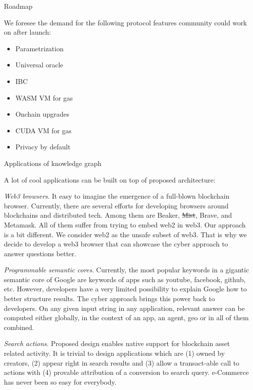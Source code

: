 \documentclass[10pt,oneside]{amsart}
\makeatletter
\def\section{\@startsection{section}{1}%
  \z@{.7\linespacing\@plus\linespacing}{.5\linespacing}%
  {\normalfont\scshape}}%
\makeatother
\begin{document}
\section{Roadmap}\label{Roadmap}

We foresee the demand for the following protocol features community could work on after launch:

\begin{itemize}
\item Parametrization
\item Universal oracle
\item IBC
\item WASM VM for gas
\item Onchain upgrades
\item CUDA VM for gas
\item Privacy by default
\end{itemize}

\section{Applications of knowledge graph}\label{Applications of knowledge graph}

A lot of cool applications can be built on top of proposed architecture:

\textit{Web3 browsers}. It easy to imagine the emergence of a full-blown blockchain browser. Currently, there are several efforts for developing browsers around blockchains and distributed tech. Among them are Beaker, \sout{Mist}, Brave, and Metamask. All of them suffer from trying to embed web2 in web3. Our approach is a bit different. We consider web2 as the unsafe subset of web3. That is why we decide to develop a web3 browser that can showcase the cyber approach to answer questions better.

\textit{Programmable semantic cores}. Currently, the most popular keywords in a gigantic semantic core of Google are keywords of apps such as youtube, facebook, github, etc. However, developers have a very limited possibility to explain Google how to better structure results. The cyber approach brings this power back to developers. On any given input string in any application, relevant answer can be computed either globally, in the context of an app, an agent, geo or in all of them combined.

\textit{Search actions}. Proposed design enables native support for blockchain asset related activity. It is trivial to design applications which are (1) owned by creators, (2) appear right in search results and (3) allow a transact-able call to actions with (4) provable attribution of a conversion to search query. e-Commerce has never been so easy for everybody.
\end{document}

